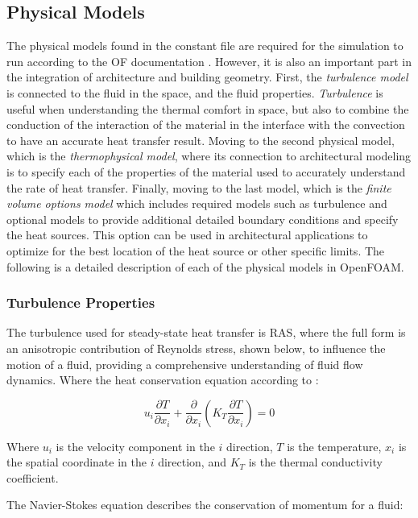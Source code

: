 \subsection{Physical Models}
The physical models found in the constant file are required for the simulation to run according to the \gls{OF} documentation \cite{OFD}. However, it is also an important part in the integration of architecture and building geometry. First, the \textit{turbulence model} is connected to the fluid in the space, and the fluid properties. \textit{Turbulence} is useful when understanding the thermal comfort in space, but also to combine the conduction of the interaction of the material in the interface with the convection to have an accurate heat transfer result. Moving to the second physical model, which is the \textit{ thermophysical model}, where its connection to architectural modeling is to specify each of the properties of the material used to accurately understand the rate of heat transfer. Finally, moving to the last model, which is the \textit{finite volume options model} which includes required models such as turbulence and optional models to provide additional detailed boundary conditions and specify the heat sources. 
This option can be used in architectural applications to optimize for the best location of the heat source or other specific limits. The following is a detailed description of each of the physical models in OpenFOAM.


\subsubsection{Turbulence Properties}
The turbulence used for steady-state heat transfer is \gls{RAS}, where the full form is an anisotropic contribution of Reynolds stress, shown below, to influence the motion of a fluid, providing a comprehensive understanding of fluid flow dynamics. Where the heat conservation equation according to \cite{hce}:

\begin{equation}
u_i \frac{\partial T}{\partial x_i} + \frac{\partial}{\partial x_i}(K_T \frac{\partial T}{\partial x_i}) = 0 \label{eq:heat}
\end{equation}

Where \(u_i\) is the velocity component in the \(i\) direction, \(T\) is the temperature, \(x_i\) is the spatial coordinate in the \(i\) direction, and \(K_T\) is the thermal conductivity coefficient.

The Navier-Stokes equation describes the conservation of momentum for a fluid:

